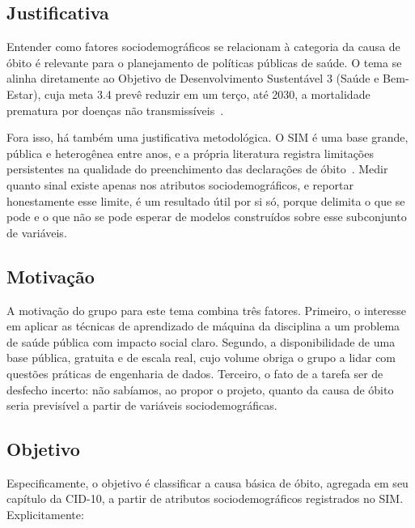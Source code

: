 \documentclass[12pt]{article}
\begin{document}
\subsection{Justificativa}

Entender como fatores sociodemográficos se relacionam à categoria da causa de óbito é relevante para o planejamento de políticas públicas de saúde. O tema se alinha diretamente ao Objetivo de Desenvolvimento Sustentável 3 (Saúde e Bem-Estar), cuja meta 3.4 prevê reduzir
em um terço, até 2030, a mortalidade prematura por doenças não
transmissíveis~\cite{ods3}.

Fora isso, há também uma justificativa metodológica. O SIM é uma base grande, pública e heterogênea entre anos, e a própria literatura registra limitações persistentes na qualidade do preenchimento das declarações de óbito~\cite{morais2017}. Medir quanto sinal existe apenas nos atributos sociodemográficos, e reportar honestamente esse limite, é um resultado útil por si só, porque delimita o que se pode e o que não se pode esperar de modelos construídos sobre esse subconjunto de variáveis.

\subsection{Motivação}

A motivação do grupo para este tema combina três fatores. Primeiro, o
interesse em aplicar as técnicas de aprendizado de máquina da disciplina a um problema de saúde pública com impacto social claro. Segundo, a disponibilidade de uma base pública, gratuita e de escala real, cujo volume obriga o grupo a lidar com questões práticas de engenharia de dados. Terceiro, o fato de a tarefa ser de desfecho incerto: não sabíamos, ao propor o projeto, quanto da causa de óbito seria previsível a partir de variáveis
sociodemográficas.

\subsection{Objetivo}

Especificamente, o objetivo é classificar a causa básica de óbito, agregada em seu capítulo da CID-10, a partir de atributos sociodemográficos registrados no SIM. Explicitamente:
\end{document}
